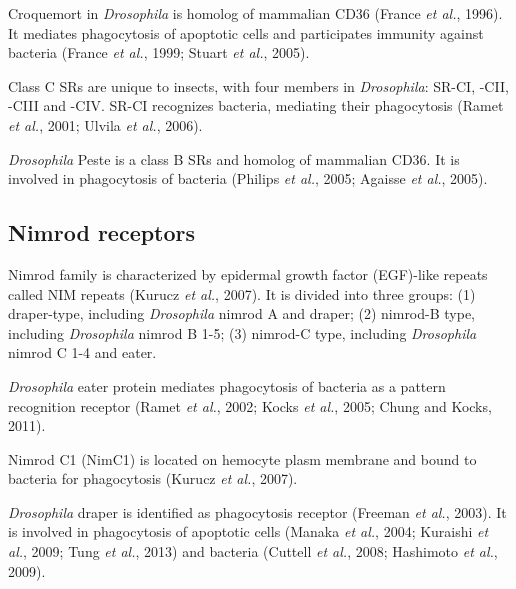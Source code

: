 \documentclass[11pt]{article}
\begin{document}
\newline

Croquemort in \textit{Drosophila} is homolog of mammalian CD36 (France \textit{et al.}, 1996). 
It mediates phagocytosis of apoptotic cells and participates immunity against bacteria (France \textit{et al.}, 1999; Stuart \textit{et al.}, 2005). 

\newline

Class C SRs are unique to insects, with four members in \textit{Drosophila}: SR-CI, -CII, -CIII and -CIV. 
SR-CI recognizes bacteria, mediating their phagocytosis (Ramet \textit{et al.}, 2001; Ulvila \textit{et al.}, 2006).  

\newline

\textit{Drosophila} Peste is a class B SRs and homolog of mammalian CD36. 
It is involved in phagocytosis of bacteria (Philips \textit{et al.}, 2005; Agaisse \textit{et al.}, 2005).

\subsection{Nimrod receptors}
Nimrod family is characterized by epidermal growth factor (EGF)-like repeats called NIM repeats (Kurucz \textit{et al.}, 2007). 
It is divided into three groups: 
(1) draper-type, including \textit{Drosophila} nimrod A and draper; 
(2) nimrod-B type, including \textit{Drosophila} nimrod B 1-5; 
(3) nimrod-C type, including \textit{Drosophila} nimrod C 1-4 and eater. 

\newline

\textit{Drosophila} eater protein mediates phagocytosis of bacteria as a pattern recognition receptor (Ramet \textit{et al.}, 2002; Kocks \textit{et al.}, 2005; Chung and Kocks, 2011).

\newline

Nimrod C1 (NimC1) is located on hemocyte plasm membrane and bound to bacteria for phagocytosis (Kurucz \textit{et al.}, 2007).

\newline

\textit{Drosophila} draper is identified as phagocytosis receptor (Freeman \textit{et al.}, 2003).
It is involved in phagocytosis of apoptotic cells (Manaka \textit{et al.}, 2004; Kuraishi \textit{et al.}, 2009; Tung \textit{et al.}, 2013) and bacteria (Cuttell \textit{et al.}, 2008; Hashimoto \textit{et al.}, 2009).
\end{document}
